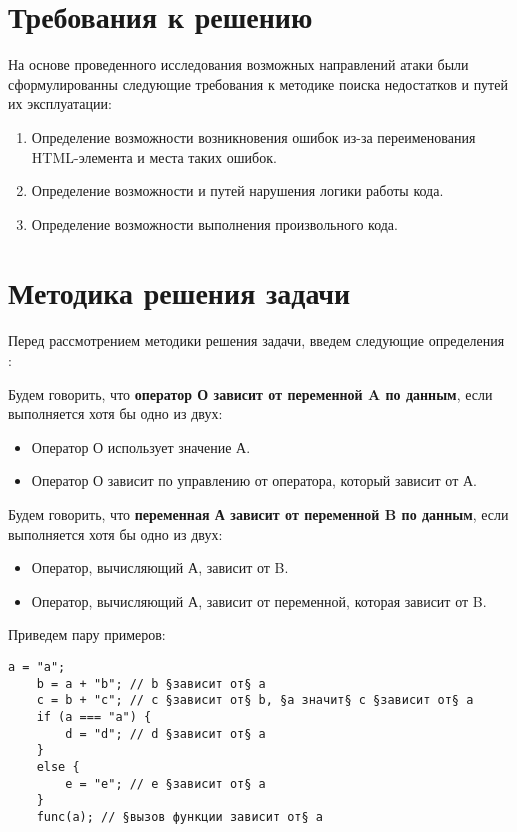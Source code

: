 \section{Требования к решению}
На основе проведенного исследования возможных направлений атаки были сформулированны следующие требования к методике поиска недостатков и путей их эксплуатации:

\begin{enumerate}
	\item Определение возможности возникновения ошибок из-за переименования \\HTML-элемента и места таких ошибок.
	\item Определение возможности и путей нарушения логики работы кода.
	\item Определение возможности выполнения произвольного кода.
\end{enumerate}

\section{Методика решения задачи}
Перед рассмотрением методики решения задачи, введем следующие определения \cite{comparch}:


Будем говорить, что \textbf{оператор О зависит от переменной A по данным}, если выполняется хотя бы одно из двух:

\bigskip
\begin{itemize}
	\item Оператор О использует значение А.
	\item Оператор О зависит по управлению от оператора, который зависит от А.
\end{itemize}


Будем говорить, что \textbf{переменная А зависит от переменной B по данным}, если выполняется хотя бы одно из двух:
\begin{itemize}
	\item Оператор, вычисляющий А, зависит от B.
	\item Оператор, вычисляющий А, зависит от переменной, которая зависит от B.
\end{itemize}

\bigskip
Приведем пару примеров:
\begin{lstlisting}[caption=пример вычисления зависимостей]
	a = "a";
	b = a + "b"; // b §зависит от§ a
	c = b + "c"; // c §зависит от§ b, §а значит§ c §зависит от§ a
	if (a === "a") { 
		d = "d"; // d §зависит от§ a
	}
	else {
		e = "e"; // e §зависит от§ a
	}
	func(a); // §вызов функции зависит от§ a
\end{lstlisting}
\bigskip


